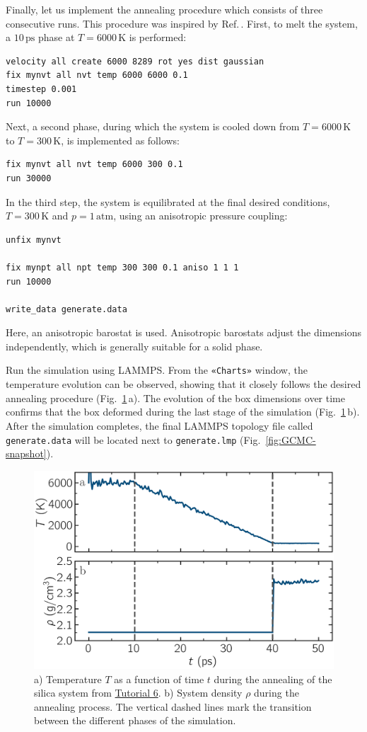 \documentclass[9pt,tutorial]{livecoms}
\newcommand{\flecmd}[1]{\textcolor{command}{\texttt{#1}}} %
\newcommand{\guicmd}[1]{\textcolor{command}{\texttt{«#1»}}} %
\begin{document}
Finally, let us implement the annealing procedure which
consists of three consecutive runs.  This procedure was inspired
by Ref.\,\cite{della1992molecular}.  First, to melt the system,
a $10\,\text{ps}$ phase at $T = 6000\,\text{K}$ is performed:
\begin{lstlisting}
velocity all create 6000 8289 rot yes dist gaussian
fix mynvt all nvt temp 6000 6000 0.1
timestep 0.001
run 10000
\end{lstlisting}
Next, a second phase, during which the system is cooled down from $T = 6000\,\text{K}$
to $T = 300\,\text{K}$, is implemented as follows:
\begin{lstlisting}
fix mynvt all nvt temp 6000 300 0.1
run 30000
\end{lstlisting}
In the third step, the system is equilibrated at the final desired
conditions, $T = 300\,\text{K}$ and $p = 1\,\text{atm}$,
using an anisotropic pressure coupling:
\begin{lstlisting}
unfix mynvt

fix mynpt all npt temp 300 300 0.1 aniso 1 1 1
run 10000

write_data generate.data
\end{lstlisting}
Here, an anisotropic barostat is used.
Anisotropic barostats adjust the dimensions independently, which is
generally suitable for a solid phase.

Run the simulation using LAMMPS.  From the \guicmd{Charts} window, the temperature
evolution can be observed, showing that it closely follows the desired annealing procedure (Fig.~\ref{fig:GCMC-dimension}\,a).
The evolution of the box dimensions over time confirms that the box
deformed during the last stage of the simulation
(Fig.~\ref{fig:GCMC-dimension}\,b).  After the simulation completes, the final
LAMMPS topology file called \flecmd{generate.data}
will be located next to \flecmd{generate.lmp} (Fig.~\ref{fig:GCMC-snapshot}).

\begin{figure}
\centering
\includegraphics[width=\linewidth]{GCMC-dimension}
\caption{a) Temperature $T$ as a function of time $t$ during the annealing
of the silica system from \hyperref[gcmc-silica-label]{Tutorial 6}.
b) System density $\rho$ during the annealing process.  The vertical dashed lines
mark the transition between the different phases of the simulation.}
\label{fig:GCMC-dimension}
\end{figure}
\end{document}
